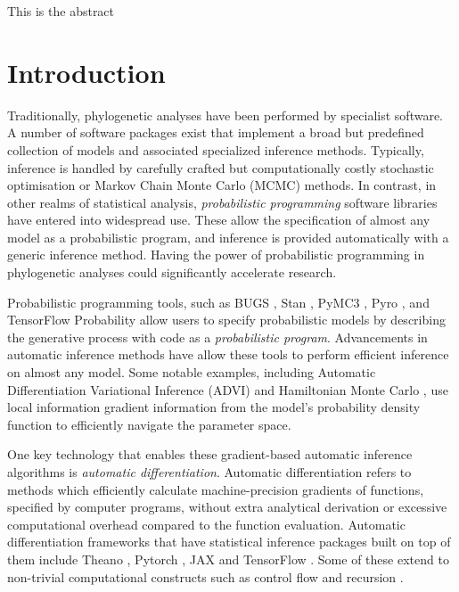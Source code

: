 
\usepackage{booktabs}

This is the abstract

\section{Introduction}

Traditionally, phylogenetic analyses have been performed by specialist software. A number of software packages exist that implement a broad but predefined collection of models and associated specialized inference methods. Typically, inference is handled by carefully crafted but computationally costly stochastic optimisation or Markov Chain Monte Carlo (MCMC) methods. In contrast, in other realms of statistical analysis, \textit{probabilistic programming} software libraries have entered into widespread use. These allow the specification of almost any model as a probabilistic program, and inference is provided automatically with a generic inference method. Having the power of probabilistic programming in phylogenetic analyses could significantly accelerate research. %

Probabilistic programming tools, such as BUGS \cite{lunn2000winbugs}, Stan \cite{carpenter2017stan}, PyMC3 \cite{salvatier2016probabilistic}, Pyro \cite{bingham2019pyro}, and TensorFlow Probability \cite{dillon2017tensorflow} allow users to specify probabilistic models by describing the generative process with code as a \textit{probabilistic program}. Advancements in automatic inference methods have allow these tools to perform efficient inference on almost any model. Some notable examples, including Automatic Differentiation Variational Inference \cite{kucukelbir2017automatic} (ADVI) and Hamiltonian Monte Carlo \cite{duane1987hybrid}, use local information gradient information from the model's probability density function to efficiently navigate the parameter space.

One key technology that enables these gradient-based automatic inference algorithms is \textit{automatic differentiation}. Automatic differentiation refers to methods which efficiently calculate machine-precision gradients of functions, specified by computer programs, without extra analytical derivation or excessive computational overhead compared to the function evaluation. Automatic differentiation frameworks that have statistical inference packages built on top of them include Theano \cite{bergstra2010theano}, Pytorch \cite{paszke2019pytorch}, JAX \cite{jax2018github} and TensorFlow \cite{abadi2016tensorflow}. Some of these extend to non-trivial computational constructs such as control flow and recursion \cite{yu2018dynamic}.

